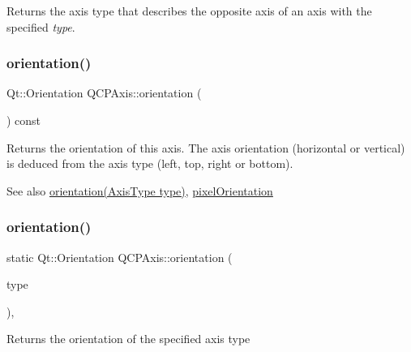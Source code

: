 Returns the axis type that describes the opposite axis of an axis with the specified {\itshape type}. \mbox{\label{class_q_c_p_axis_ab988ef4538e2655bb77bd138189cd42e}} 
\subsubsection{\texorpdfstring{orientation()}{orientation()}\hspace{0.1cm}{\footnotesize\ttfamily [1/2]}}
{\footnotesize\ttfamily Qt\+::\+Orientation Q\+C\+P\+Axis\+::orientation (\begin{DoxyParamCaption}{ }\end{DoxyParamCaption}) const\hspace{0.3cm}{\ttfamily [inline]}}

Returns the orientation of this axis. The axis orientation (horizontal or vertical) is deduced from the axis type (left, top, right or bottom).

\begin{DoxySeeAlso}{See also}
\hyperlink{class_q_c_p_axis_a9a68b3e45f1b1e33d4d807822342516c}{orientation(\+Axis\+Type type)}, \hyperlink{class_q_c_p_axis_a45c45bed7e5666683b8d56afa66fa51f}{pixel\+Orientation} 
\end{DoxySeeAlso}
\mbox{\label{class_q_c_p_axis_a9a68b3e45f1b1e33d4d807822342516c}} 
\subsubsection{\texorpdfstring{orientation()}{orientation()}\hspace{0.1cm}{\footnotesize\ttfamily [2/2]}}
{\footnotesize\ttfamily static Qt\+::\+Orientation Q\+C\+P\+Axis\+::orientation (\begin{DoxyParamCaption}\item[{\hyperlink{class_q_c_p_axis_ae2bcc1728b382f10f064612b368bc18a}{Axis\+Type}}]{type }\end{DoxyParamCaption})\hspace{0.3cm}{\ttfamily [inline]}, {\ttfamily [static]}}

Returns the orientation of the specified axis type

